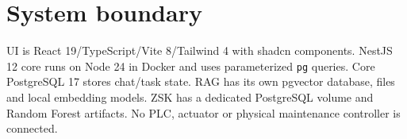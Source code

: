 \section{System boundary}
UI is React 19/TypeScript/Vite 8/Tailwind 4 with shadcn components. NestJS 12 core runs on Node 24 in Docker and uses parameterized \texttt{pg} queries. Core PostgreSQL 17 stores chat/task state. RAG has its own pgvector database, files and local embedding models. ZSK has a dedicated PostgreSQL volume and Random Forest artifacts. No PLC, actuator or physical maintenance controller is connected.
